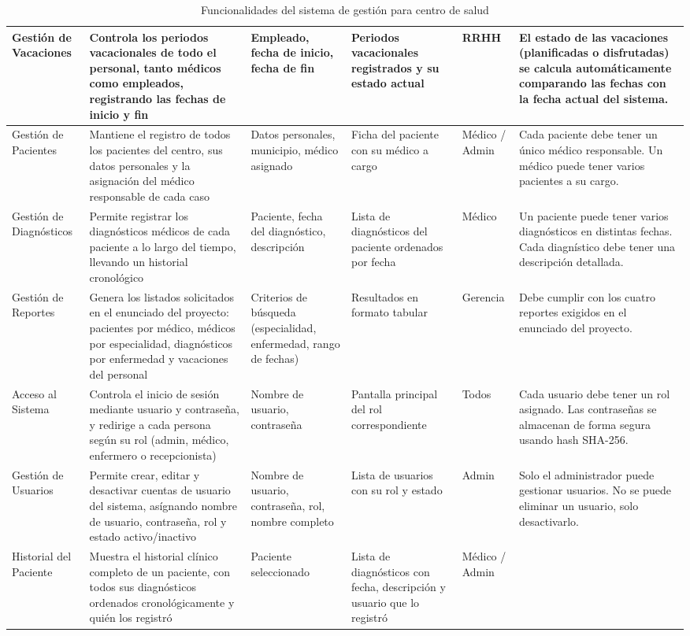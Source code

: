 \documentclass[12pt,a4paper]{article}
\begin{document}
{\begin{longtable}{|p{2.3cm}|p{3.5cm}|p{2.2cm}|p{2cm}|p{1.2cm}|p{2.8cm}|}
Gesti\'on de Vacaciones &
Controla los periodos vacacionales de todo el personal, tanto m\'edicos como empleados, registrando las fechas de inicio y fin &
Empleado, fecha de inicio, fecha de fin &
Periodos vacacionales registrados y su estado actual &
RRHH &
El estado de las vacaciones (planificadas o disfrutadas) se calcula autom\'aticamente comparando las fechas con la fecha actual del sistema. \\ \hline

Gesti\'on de Pacientes &
Mantiene el registro de todos los pacientes del centro, sus datos personales y la asignaci\'on del m\'edico responsable de cada caso &
Datos personales, municipio, m\'edico asignado &
Ficha del paciente con su m\'edico a cargo &
M\'edico / Admin &
Cada paciente debe tener un \'unico m\'edico responsable. Un m\'edico puede tener varios pacientes a su cargo. \\ \hline

Gesti\'on de Diagn\'osticos &
Permite registrar los diagn\'osticos m\'edicos de cada paciente a lo largo del tiempo, llevando un historial cronol\'ogico &
Paciente, fecha del diagn\'ostico, descripci\'on &
Lista de diagn\'osticos del paciente ordenados por fecha &
M\'edico &
Un paciente puede tener varios diagn\'osticos en distintas fechas. Cada diagn\'istico debe tener una descripci\'on detallada. \\ \hline

Gesti\'on de Reportes &
Genera los listados solicitados en el enunciado del proyecto: pacientes por m\'edico, m\'edicos por especialidad, diagn\'osticos por enfermedad y vacaciones del personal &
Criterios de b\'usqueda (especialidad, enfermedad, rango de fechas) &
Resultados en formato tabular &
Gerencia &
Debe cumplir con los cuatro reportes exigidos en el enunciado del proyecto. \\ \hline

Acceso al Sistema &
Controla el inicio de sesi\'on mediante usuario y contrase\~na, y redirige a cada persona seg\'un su rol (admin, m\'edico, enfermero o recepcionista) &
Nombre de usuario, contrase\~na &
Pantalla principal del rol correspondiente &
Todos &
Cada usuario debe tener un rol asignado. Las contrase\~nas se almacenan de forma segura usando hash SHA-256. \\ \hline

Gesti\'on de Usuarios &
Permite crear, editar y desactivar cuentas de usuario del sistema, as\'ignando nombre de usuario, contrase\~na, rol y estado activo/inactivo &
Nombre de usuario, contrase\~na, rol, nombre completo &
Lista de usuarios con su rol y estado &
Admin &
Solo el administrador puede gestionar usuarios. No se puede eliminar un usuario, solo desactivarlo. \\ \hline

Historial del Paciente &
Muestra el historial cl\'inico completo de un paciente, con todos sus diagn\'osticos ordenados cronol\'ogicamente y qui\'en los registr\'o &
Paciente seleccionado &
Lista de diagn\'osticos con fecha, descripci\'on y usuario que lo registr\'o &
M\'edico / Admin &
\caption{Funcionalidades del sistema de gesti\'on para centro de salud}
\end{longtable}
}
\end{document}
